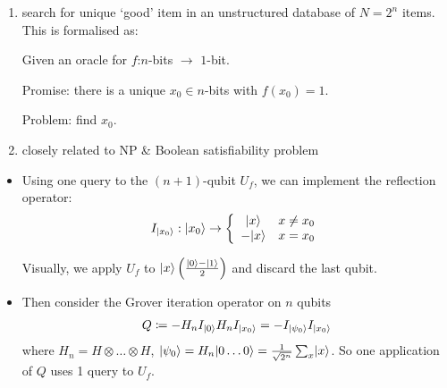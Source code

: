 \documentclass[]{article}
\DeclarePairedDelimiter\ket{\lvert}{\rangle}
\theoremstyle{custhm}
\theoremstyle{cusdef}
\theoremstyle{custhm}
\theoremstyle{custhm}
\theoremstyle{custhm}
\theoremstyle{custhm}
\theoremstyle{cusdef}
\theoremstyle{remark}
\newcommand{\ra}{\rightarrow}
\begin{document}
\begin{enumerate}[label=-]
	\item search for unique `good' item in an unstructured database of $N = 2^n$ items. This is formalised as:
	
	Given an oracle for $f$:$n$-bits $\ra$ $1$-bit.

	Promise: there is a unique $x_0 \in n$-bits with $f(x_0) = 1$.

	Problem: find $x_0$.

	\item closely related to NP \& Boolean satisfiability problem
	
\end{enumerate}
\begin{itemize}
	\item Using one query to the $(n+1)$-qubit $U_f$, we can implement the reflection operator:
	\begin{align*}
		I_{\ket{x_0}}:\ket{x_0} \ra \left\lbrace \begin{array}{cc} \ket{x} & x\ne x_0 \\ -\ket{x} & x = x_0 \end{array}\right.
	\end{align*}

	Visually, we apply $U_f$ to $\ket{x}\left(\frac{\ket{0} - \ket{1}}{2}\right)$ and discard the last qubit.

	\item Then consider the Grover iteration operator on $n$ qubits
	\begin{align*}
		Q\coloneqq -H_nI_{\ket{0}}H_nI_{\ket{x_0}} = -I_{\ket{\psi_0}}I_{\ket{x_0}}
	\end{align*}
	where $H_n = H\otimes \dots\otimes H$, $\ket{\psi_0} = H_n\ket{0\dots0} = \frac{1}{\sqrt{2^n}}\sum_{x}\ket{x}$. So one application of $Q$ uses 1 query to $U_f$.
\end{itemize}
\end{document}
